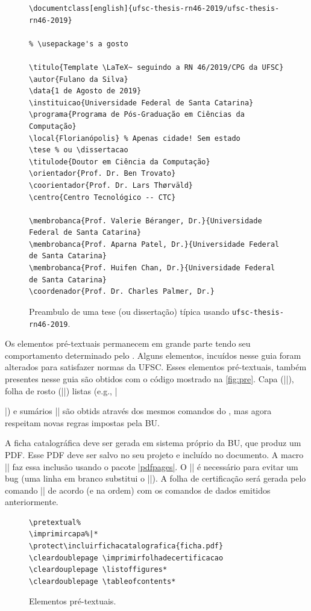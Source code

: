 \documentclass[embeddedlogo]{ufsc-thesis-rn46-2019}
\begin{document}
\begin{figure}[tb]
  \centering
  \caption{Preambulo de uma tese (ou dissertação) típica usando \texttt{ufsc-thesis-rn46-2019}.}
  \label{fig:preambulo}
  \begin{verbatim}
\documentclass[english]{ufsc-thesis-rn46-2019/ufsc-thesis-rn46-2019}

% \usepackage's a gosto

\titulo{Template \LaTeX~ seguindo a RN 46/2019/CPG da UFSC}
\autor{Fulano da Silva}
\data{1 de Agosto de 2019}
\instituicao{Universidade Federal de Santa Catarina}
\programa{Programa de Pós-Graduação em Ciências da Computação}
\local{Florianópolis} % Apenas cidade! Sem estado
\tese % ou \dissertacao
\titulode{Doutor em Ciência da Computação}
\orientador{Prof. Dr. Ben Trovato}
\coorientador{Prof. Dr. Lars Thørväld}
\centro{Centro Tecnológico -- CTC}

\membrobanca{Prof. Valerie Béranger, Dr.}{Universidade Federal de Santa Catarina}
\membrobanca{Prof. Aparna Patel, Dr.}{Universidade Federal de Santa Catarina}
\membrobanca{Prof. Huifen Chan, Dr.}{Universidade Federal de Santa Catarina}
\coordenador{Prof. Dr. Charles Palmer, Dr.}
  \end{verbatim}
\end{figure}

Os elementos pré-textuais permanecem em grande parte tendo seu comportamento determinado pelo \abnTeX. Alguns elementos, incuídos nesse guia foram alterados para satisfazer normas da UFSC. Esses elementos pré-textuais, também presentes nesse guia são obtidos com o código mostrado na \autoref{fig:pre}. Capa (\mt|\imprimircapa|), folha de rosto (\mt|\imprimirfolhaderosto*|) listas (e.g., \mt|\listoffigures*|) e sumários \mt|\tableofcontents*| são obtids através dos mesmos comandos do \abnTeX, mas agora respeitam novas regras impostas pela BU. 

A ficha catalográfica deve ser gerada em sistema próprio da BU, que produz um PDF. Esse PDF deve ser salvo no seu projeto e incluído no documento. A macro \mt|| faz essa inclusão usando o pacote \href{https://www.ctan.org/pkg/pdfpages}{\mt|pdfpages|}. O \mt|\protect| é necessário para evitar um bug (uma linha em branco substitui o \mt|\protect|). A folha de certificação será gerada pelo comando \mt|\imprimirfolhadecertificacao| de acordo (e na ordem) com os comandos de dados emitidos anteriormente.

\begin{figure}[tb]
  \centering
  \caption{Elementos pré-textuais.}
  \label{fig:pre}
  \begin{verbatim}
\pretextual%
\imprimircapa%|*
\protect\incluirfichacatalografica{ficha.pdf}
\cleardoublepage \imprimirfolhadecertificacao
\cleardouplepage \listoffigures*
\cleardoublepage \tableofcontents*
  \end{verbatim}
\end{figure}
\end{document}
